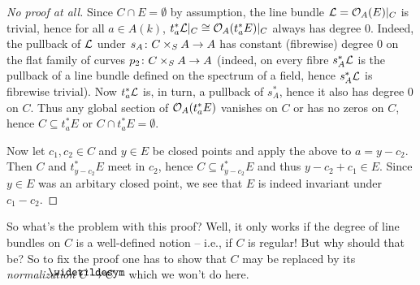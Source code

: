 \documentclass[a4paper,parskip=half,numbers=enddot, DIV=12]{scrreprt}
\begin{document}
\begin{proof}[No proof at all]
	Since $C\cap E=\emptyset$ by assumption, the line bundle $\mathcal{L}=\mathcal{O}_A(E)|_C$ is trivial, hence for all $a\in A(k)$, $t_a^*\mathcal{L}|_C\cong \mathcal{O}_A(t_a^*E)|_C$ always has degree $0$. Indeed, the pullback of $\mathcal{L}$ under $s_A\colon C\times_SA\morphism A$ has constant (fibrewise) degree $0$ on the flat family of curves $p_2\colon C\times_SA\morphism A$ (indeed, on every fibre $s_A^*\mathcal{L}$ is the pullback of  a line bundle defined on the spectrum of a field, hence $s_A^*\mathcal{L}$ is fibrewise trivial). Now $t_a^*\mathcal{L}$ is, in turn, a pullback of $s_A^*$, hence it also has degree $0$ on $C$. Thus any global section of $\mathcal{O}_A(t_a^*E)$ vanishes on $C$ or has no zeros on $C$, hence $C\subseteq t_a^*E$ or $C\cap t_a^*E=\emptyset$.
	
	Now let $c_1,c_2\in C$ and $y\in E$ be closed points and apply the above to $a=y-c_2$. Then $C$ and $t_{y-c_2}^*E$ meet in $c_2$, hence $C\subseteq t_{y-c_2}^*E$ and thus $y-c_2+c_1\in E$. Since $y\in E$ was an arbitary closed point, we see that $E$ is indeed invariant under $c_1-c_2$.
\end{proof}
\begin{rem}
	So what's the problem with this proof? Well, it only works if the degree of line bundles on $C$ is a well-defined notion -- i.e., if $C$ is regular! But why should that be? So to fix the proof one has to show that $C$ may be replaced by its \emph{normalization} $\snake{C}\morphism C$ -- which we won't do here.
\end{rem}
	
\end{document}

